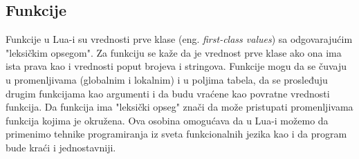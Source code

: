 \documentclass[a4paper]{article}
\begin{document}


\subsection{Funkcije}
\label{sec:funkcije}

Funkcije u Lua-i su vrednosti prve klase (eng. \textit{first-class values}) sa odgovarajućim "leksičkim opsegom". Za funkciju se kaže da je vrednost prve klase ako ona ima ista prava kao i vrednosti poput brojeva i stringova. Funkcije mogu da se čuvaju u promenljivama (globalnim i lokalnim) i u poljima tabela, da se prosleđuju drugim funkcijama kao argumenti i da budu vraćene kao povratne vrednosti funkcija. Da funkcija ima "leksički opseg" znači da može pristupati promenljivama funkcija kojima je okružena. Ova osobina omogućava da u Lua-i možemo da primenimo tehnike programiranja iz sveta funkcionalnih jezika kao i da program bude kraći i jednostavniji.
\end{document}

